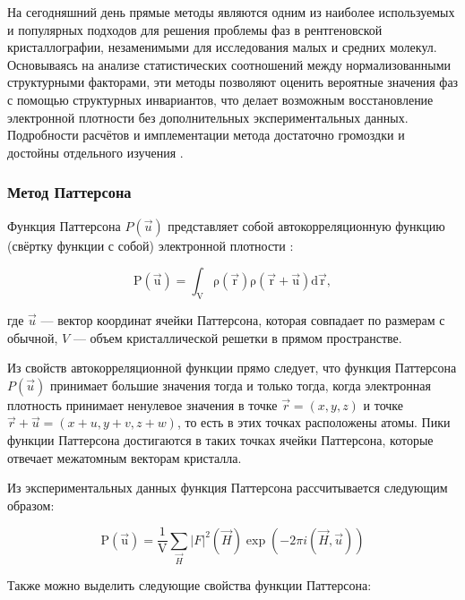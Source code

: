 На сегодняшний день прямые методы являются одним из наиболее используемых и популярных подходов для решения проблемы фаз в рентгеновской кристаллографии, незаменимыми для исследования малых и средних молекул. Основываясь на анализе статистических соотношений между нормализованными структурными факторами, эти методы позволяют оценить вероятные значения фаз с помощью структурных инвариантов, что делает возможным восстановление электронной плотности без дополнительных экспериментальных данных. Подробности расчётов и имплементации метода достаточно громоздки и достойны отдельного изучения \cite{giacovazzo_direct_1998}.

\subsubsection{Метод Паттерсона}

Функция Паттерсона $P(\overrightarrow{u})$ представляет собой автокорреляционную функцию (свёртку функции с собой) электронной плотности \cite{girolami_x-ray_2016}:

\begin{equation}
	\mathrm{P(\overrightarrow{u}) = \int_V \rho(\overrightarrow{r})\rho(\overrightarrow{r}+\overrightarrow{u})d\overrightarrow{r}},
\end{equation}

где $\overrightarrow{u}$ --- вектор координат ячейки Паттерсона, которая совпадает по размерам с обычной, $V$ --- объем кристаллической решетки в прямом пространстве.

Из свойств автокорреляционной функции прямо следует, что функция Паттерсона $P(\overrightarrow{u})$ принимает большие значения тогда и только тогда, когда электронная плотность принимает ненулевое значения в точке $\overrightarrow{r} = (x,y,z)$ и точке $\overrightarrow{r}+\overrightarrow{u} = (x+u, y+v, z+w)$, то есть в этих точках расположены атомы. Пики функции Паттерсона достигаются в таких точках ячейки Паттерсона, которые отвечает межатомным векторам кристалла.

Из экспериментальных данных функция Паттерсона рассчитывается следующим образом:

\begin{equation}\label{patt_start}
	\mathrm{P(\overrightarrow{u})=\frac{1}{V}}\sum_{\overrightarrow{H}}|F|^2(\overrightarrow{H})\exp(-2\pi i (\overrightarrow{H}, \overrightarrow{u}))
\end{equation}


Также можно выделить следующие свойства функции Паттерсона:

